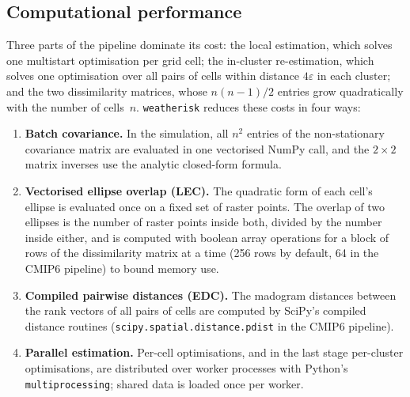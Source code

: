 \documentclass[preprint,12pt,a4paper]{elsarticle}
\begin{document}
\subsection{Computational performance}
\label{sec:performance}

Three parts of the pipeline dominate its cost: the local estimation,
which solves one multistart optimisation per grid cell; the
in-cluster re-estimation, which solves one optimisation over all
pairs of cells within distance $4\varepsilon$ in each cluster; and the
two dissimilarity matrices, whose $n(n-1)/2$ entries grow
quadratically with the number of cells~$n$.
\texttt{weatherisk} reduces these costs in four ways:

\begin{enumerate}
\item \textbf{Batch covariance.}
  In the simulation, all $n^2$ entries of the non-stationary
  covariance matrix are evaluated in one vectorised NumPy call, and
  the $2\times 2$ matrix inverses use the analytic closed-form formula.

\item \textbf{Vectorised ellipse overlap (LEC).}
  The quadratic form of each cell's ellipse is evaluated once on a
  fixed set of raster points. The overlap of two ellipses is the
  number of raster points inside both, divided by the number inside
  either, and is computed with boolean array operations for a block
  of rows of the dissimilarity matrix at a time (256 rows by default,
  64 in the CMIP6 pipeline) to bound memory use.

\item \textbf{Compiled pairwise distances (EDC).}
  The madogram distances between the rank vectors of all pairs of
  cells are computed by SciPy's compiled distance routines
  (\texttt{scipy.spatial.distance.\allowbreak{}pdist} in the CMIP6
  pipeline).

\item \textbf{Parallel estimation.}
  Per-cell optimisations, and in the last stage per-cluster
  optimisations, are distributed over worker processes with Python's
  \texttt{multiprocessing}; shared data is loaded once per worker.
\end{enumerate}
\end{document}
